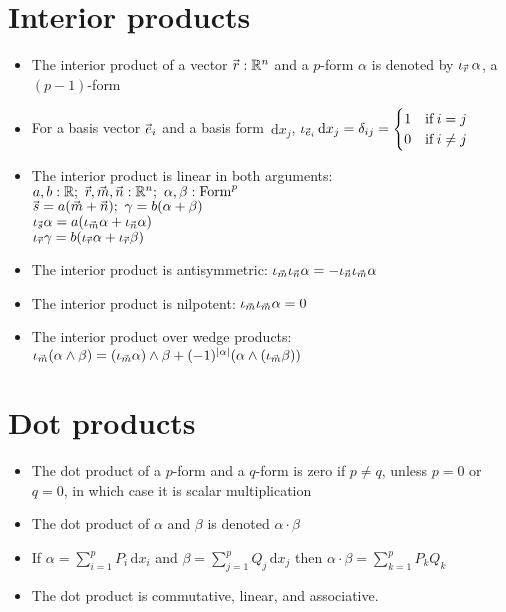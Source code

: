 \documentclass[a4paper,11pt]{report}
\newcommand{\real}{\ensuremath{\mathbb{R}}}
\newcommand{\diff}{\ensuremath{\, \mathrm{d}}}
\DeclarePairedDelimiter{\abs}{\lvert}{\rvert}
\DeclareRobustCommand{\zvec}[1]{%
  \mathrlap{\vec{\mkern-2mu\phantom{#1}}}#1%
}
\begin{document}
\section{Interior products}
\begin{itemize} \itemsep -2pt
    \item The interior product of a vector $\zvec{r} : \real^n$ and a $p$-form $\alpha$ is denoted by $\iota_{\zvec{r}} \, \alpha$, a $(p-1)$-form
    \item For a basis vector $\zvec{e}_i$ and a basis form $\diff x_j$, $\iota_{\zvec{e}_i} \diff x_j = \delta_{i j} = \begin{cases} 1 & \mathrm{if} \, i = j \\ 0 & \mathrm{if} \, i \ne j\end{cases}$
    \item The interior product is linear in both arguments: \\
        $a, b : \real;\, \, \zvec{r}, \zvec{m}, \zvec{n} : \real^n;\, \, \alpha, \beta : \mathrm{Form}^p$ \\
        $\zvec{s} = a (\zvec{m} + \zvec{n});\, \, \gamma = b (\alpha + \beta)$ \\
        $\iota_{\zvec{s}} \alpha = a (\iota_{\zvec{m}} \alpha + \iota_{\zvec{n}} \alpha)$ \\
        $\iota_{\zvec{r}} \gamma = b (\iota_{\zvec{r}} \alpha + \iota_{\zvec{r}} \beta)$
    \item The interior product is antisymmetric: $\iota_{\zvec{m}} \iota_{\zvec{n}} \alpha = -\iota_{\zvec{n}} \iota_{\zvec{m}} \alpha$
    \item The interior product is nilpotent: $\iota_{\zvec{m}} \iota_{\zvec{m}} \alpha = 0$
    \item The interior product over wedge products: $\iota_{\zvec{m}} (\alpha \wedge \beta) = (\iota_{\zvec{m}} \alpha) \wedge \beta + (-1)^{\abs{\alpha}} (\alpha \wedge (\iota_{\zvec{m}} \beta))$
\end{itemize}

\section{Dot products}
\begin{itemize} \itemsep -2pt
    \item The dot product of a $p$-form and a $q$-form is zero if $p \neq q$, unless $p = 0$ or $q = 0$, in which case it is scalar multiplication
    \item The dot product of $\alpha$ and $\beta$ is denoted $\alpha \cdot \beta$
    \item If $\displaystyle \alpha = \sum^{p}_{i = 1} P_i \diff x_i$ and $\displaystyle \beta = \sum^{p}_{j = 1} Q_j \diff x_j$ then $\displaystyle \alpha \cdot \beta = \sum^{p}_{k = 1} P_k Q_k$
    \item The dot product is commutative, linear, and associative.
\end{itemize}
\end{document}
